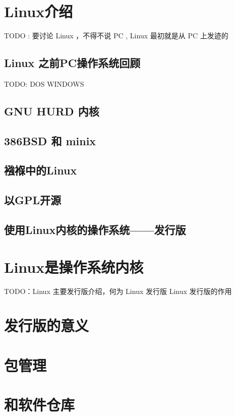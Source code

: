 \documentclass[amstex]{ctexbook}
\begin{document}
\section{Linux介绍}

TODO :  要讨论 Linux ，不得不说 PC , Linux 最初就是从 PC 上发迹的

\subsection{Linux 之前PC操作系统回顾}

TODO:  DOS WINDOWS
\subsection{GNU HURD 内核}

 
\subsection{386BSD 和 minix}



\subsection{襁褓中的Linux}
\subsection{以GPL开源}

\subsection{使用Linux内核的操作系统——发行版}
\section{Linux是操作系统内核}

TODO：Linux 主要发行版介绍，何为 Linux 发行版 Linux 发行版的作用

\section{发行版的意义}
\section{包管理}
\section{和软件仓库}
\end{document}
